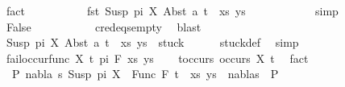 \begin{isabellebody}
\ fact\isanewline
\ \ \ \ \ \ \ \isamarkupfalse%
\ \isamarkupfalse%
\ {\isachardoublequoteopen}fst\ {\isacharparenleft}{\kern0pt}{\isacharparenleft}{\kern0pt}Susp\ pi\ X{\isacharcomma}{\kern0pt}\ Abst\ a\ t{\isacharparenright}{\kern0pt}\ {\isacharhash}{\kern0pt}\ xs{\isacharcomma}{\kern0pt}\ ys{\isacharparenright}{\kern0pt}\ {\isasymnoteq}\ {\isacharbrackleft}{\kern0pt}{\isacharbrackright}{\kern0pt}{\isachardoublequoteclose}\isanewline
\ \ \ \ \ \ \ \ \isamarkupfalse%
\ simp\isanewline
\ \ \ \ \ \ \isamarkupfalse%
\ \isamarkupfalse%
\ False\ \isanewline
\ \ \ \ \ \ \ \ \isamarkupfalse%
\ c{\isacharunderscore}{\kern0pt}red{\isacharunderscore}{\kern0pt}eqs{\isacharunderscore}{\kern0pt}empty\ \isamarkupfalse%
\ blast\isanewline
\ \ \ \ \isamarkupfalse%
\isanewline
\ \ \isamarkupfalse%
\isanewline
\ \ \isamarkupfalse%
\ \isamarkupfalse%
\ {\isachardoublequoteopen}{\isacharparenleft}{\kern0pt}{\isacharparenleft}{\kern0pt}Susp\ pi\ X{\isacharcomma}{\kern0pt}\ Abst\ a\ t{\isacharparenright}{\kern0pt}\ {\isacharhash}{\kern0pt}\ xs{\isacharcomma}{\kern0pt}\ ys{\isacharparenright}{\kern0pt}\ {\isasymin}\ stuck{\isachardoublequoteclose}\isanewline
\ \ \ \ \isamarkupfalse%
\ stuck{\isacharunderscore}{\kern0pt}def\ \isamarkupfalse%
\ simp\isanewline
{}\isamarkupfalse%
\isanewline
\ \ \isamarkupfalse%
\ {\isacharparenleft}{\kern0pt}fail{\isacharunderscore}{\kern0pt}occur{\isacharunderscore}{\kern0pt}func\ X\ t\ pi\ F\ xs\ ys{\isacharparenright}{\kern0pt}\isanewline
\ \ \isamarkupfalse%
\ t{\isacharunderscore}{\kern0pt}occurs{\isacharcolon}{\kern0pt}\ {\isachardoublequoteopen}occurs\ X\ t{\isachardoublequoteclose}\ \isamarkupfalse%
\ fact\isanewline
\ \ \isamarkupfalse%
\ \isamarkupfalse%
\ {\isachardoublequoteopen}{\isasymnot}\ {\isacharparenleft}{\kern0pt}{\isasymexists}P{}\ nabla\ s{\isachardot}{\kern0pt}\ {\isacharparenleft}{\kern0pt}{\isacharparenleft}{\kern0pt}Susp\ pi\ X\ {\isasymapprox}{\isacharquery}{\kern0pt}\ Func\ F\ t{\isacharparenright}{\kern0pt}\ {\isacharhash}{\kern0pt}\ xs{\isacharcomma}{\kern0pt}\ ys{\isacharparenright}{\kern0pt}\ {\isasymTurnstile}\ {\isacharparenleft}{\kern0pt}nabla{\isacharcomma}{\kern0pt}s{\isacharparenright}{\kern0pt}\ {\isasymRightarrow}\ P{}{\isacharparenright}{\kern0pt}{\isachardoublequoteclose}\isanewline

\end{isabellebody}
